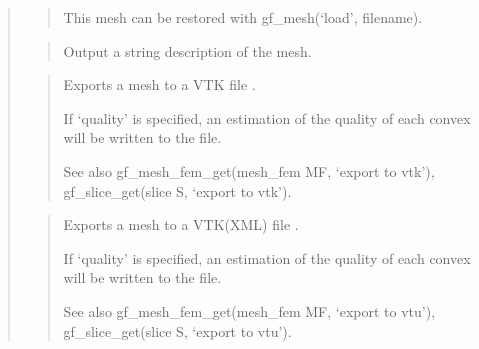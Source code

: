 \documentclass[a4paper,11pt,english]{sphinxmanual}
\begin{document}
\begin{quote}
\begin{quote}
\sphinxAtStartPar
This mesh can be restored with gf\_mesh(‘load’, filename).
\end{quote}

\sphinxAtStartPar
{}
\begin{quote}

\sphinxAtStartPar
Output a string description of the mesh.
\end{quote}

\sphinxAtStartPar
{}
\begin{quote}

\sphinxAtStartPar
Exports a mesh to a VTK file .

\sphinxAtStartPar
If ‘quality’ is specified, an estimation of the quality of each
convex will be written to the file.

\sphinxAtStartPar
See also gf\_mesh\_fem\_get(mesh\_fem MF, ‘export to vtk’), gf\_slice\_get(slice S, ‘export to vtk’).
\end{quote}

\sphinxAtStartPar
{}
\begin{quote}

\sphinxAtStartPar
Exports a mesh to a VTK(XML) file .

\sphinxAtStartPar
If ‘quality’ is specified, an estimation of the quality of each
convex will be written to the file.

\sphinxAtStartPar
See also gf\_mesh\_fem\_get(mesh\_fem MF, ‘export to vtu’), gf\_slice\_get(slice S, ‘export to vtu’).
\end{quote}

\sphinxAtStartPar
{}
\begin{quote}


\end{quote}
\end{quote}
\end{document}
